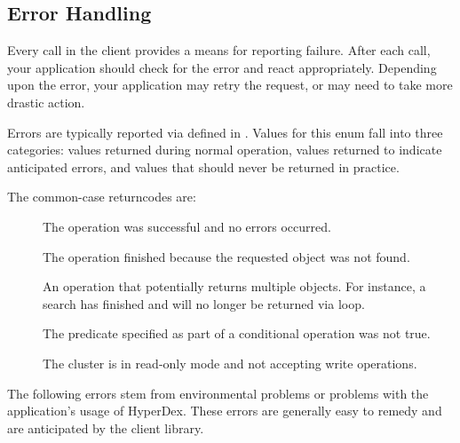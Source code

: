 \subsection{Error Handling}
\label{sec:api:c:client:error-handling}

Every call in the client provides a means for reporting failure.  After each
call, your application should check for the error and react appropriately.
Depending upon the error, your application may retry the request, or may need to
take more drastic action.

Errors are typically reported via 
defined in .  Values for this enum fall into three
categories:  values returned during normal operation, values returned to
indicate anticipated errors, and values that should never be returned in
practice.

The common-case returncodes are:

\begin{description}
\item[]  The operation was successful and no
    errors occurred.
\item[]  The operation finished because the
    requested object was not found.
\item[]  An operation that potentially
    returns multiple objects.  For instance, a search has
    finished and will no longer be returned via loop.
\item[]  The predicate specified as part of a
    conditional operation was not true.
\item[] The cluster is in read-only mode and
    not accepting write operations.
\end{description}

The following errors stem from environmental problems or problems with the
application's usage of HyperDex.  These errors are generally easy to remedy and
are anticipated by the client library.

